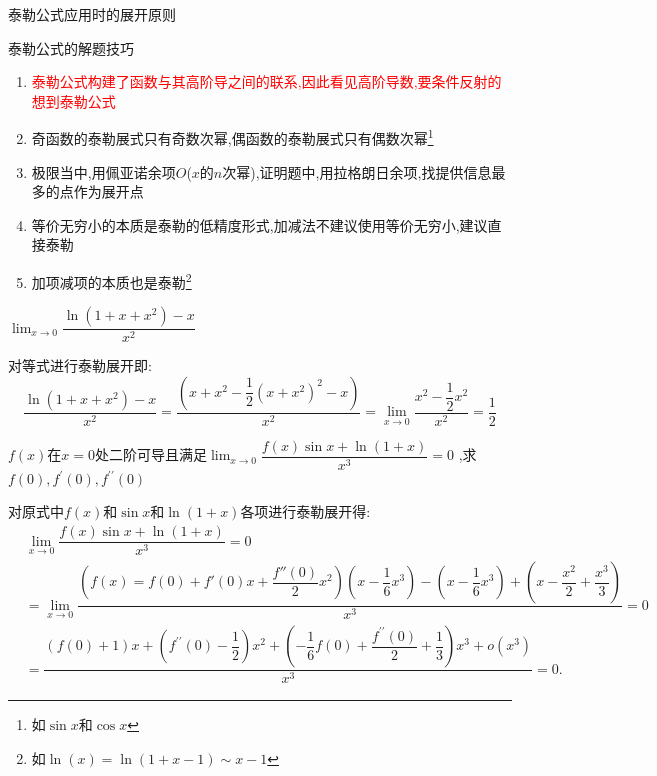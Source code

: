 \documentclass[8pt a4paper, oneside, UTF8]{ctexbook}
\begin{document}
\begin{sloppypar}
\begin{criterion}{泰勒公式应用时的展开原则}{}
\begin{itemize}
        \end{itemize}
    \end{criterion}
    \begin{criterion}{泰勒公式的解题技巧}{}
        \begin{enumerate}
            \item \textcolor{red}{泰勒公式构建了函数与其高阶导之间的联系,因此看见高阶导数,要条件反射的想到泰勒公式}
            \item 奇函数的泰勒展式只有奇数次幂,偶函数的泰勒展式只有偶数次幂\footnote{如$\sin x$和$\cos x$}
            \item 极限当中,用佩亚诺余项$O$($x$的$n$次幂),证明题中,用拉格朗日余项,找提供信息最多的点作为展开点
            \item 等价无穷小的本质是泰勒的低精度形式,加减法不建议使用等价无穷小,建议直接泰勒
            \item 加项减项的本质也是泰勒\footnote{如$\ln(x)=\ln(1+x-1)\sim x-1$}
        \end{enumerate}
    \end{criterion}
    \begin{problem}
        $\lim_{x\to0}\dfrac{\ln\left(1+x+x^{2}\right)-x}{x^{2}}$
    \end{problem}
    \begin{solution}
        对等式进行泰勒展开即:\\$$\dfrac{\ln(1+x+x^2)-x}{x^2}=\dfrac{(x+x^2-\dfrac{1}{2}(x+x^2)^2-x)}{x^2}=\lim_{x \to 0}\dfrac{x^2-\dfrac{1}{2}x^2}{x^2}=\dfrac{1}{2}$$
    \end{solution}
    \begin{problem}
        $f(x)$在$x=0$处二阶可导且满足$\lim_{x\to 0}\dfrac{f(x)\sin x+\ln(1+x)}{x^3}=0$ ,求$f(0),f^{\prime}(0),f^{\prime\prime}(0)$
    \end{problem}
    \begin{solution}
        对原式中$f(x)$和$\sin x$和$\ln(1+x)$各项进行泰勒展开得:
    \begin{equation*}
        \begin{split}    
            & \lim_{x\to 0}\dfrac{f(x)\sin x+\ln(1+x)}{x^3}=0 \\
            & = \lim_{x \to 0}\dfrac{(f(x)=f(0)+f'(0)x+\dfrac{f''(0)}{2}x^2)(x-\dfrac{1}{6}x^3)-(x-\dfrac{1}{6}x^3)+(x-\dfrac{x^2}{2}+\dfrac{x^3}{3})}{x^3}=0 \\
            & = \dfrac{(f(0)+1)x+(f^{\prime\prime}(0)-\dfrac{1}{2})x^{2}+(-\dfrac{1}{6}f(0)+\dfrac{f^{\prime\prime}(0)}{2}+\dfrac{1}{3})x^{3}+o(x^{3})}{x^{3}}=0.
    \end{split}

\end{equation*}
\end{solution}
\end{sloppypar}
\end{document}
